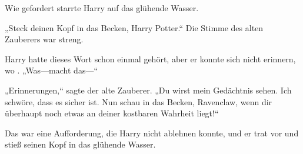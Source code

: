 Wie gefordert starrte Harry auf das glühende Wasser.

„Steck deinen Kopf in das Becken, Harry Potter.“
Die Stimme des alten Zauberers war streng.

Harry hatte dieses Wort schon einmal gehört, aber er konnte sich nicht erinnern, wo . „Was—macht das—“

„Erinnerungen,“ sagte der alte Zauberer. „Du wirst mein Gedächtnis sehen. Ich schwöre, dass es sicher ist. Nun schau in das Becken, Ravenclaw, wenn dir überhaupt noch etwas an deiner kostbaren Wahrheit liegt!“

Das war eine Aufforderung, die Harry nicht ablehnen konnte, und er trat vor und stieß seinen Kopf in das glühende Wasser.

\later

